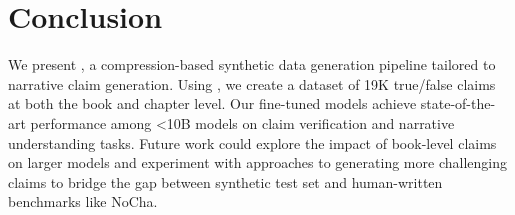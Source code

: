 \section{Conclusion}
We present \pipeline, a compression-based synthetic data generation pipeline tailored to narrative claim generation. Using \pipeline, we create a dataset of 19K true/false claims at both the book and chapter level. Our fine-tuned models achieve state-of-the-art performance among <10B models on claim verification and narrative understanding tasks. Future work could explore the impact of book-level claims on larger models and experiment with approaches to generating more challenging claims to bridge the gap between synthetic test set and human-written benchmarks like NoCha. 